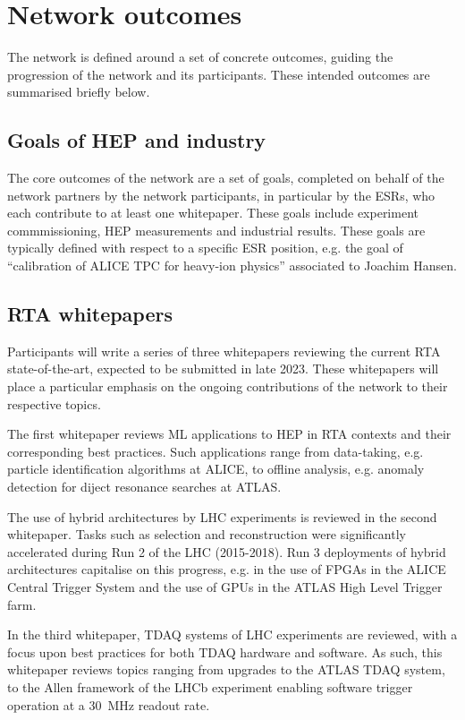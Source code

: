 \section{Network outcomes}
\label{outcomes}
The network is defined around a set of concrete outcomes, guiding the progression of the network and its participants. These intended outcomes are summarised briefly below.

\subsection{Goals of HEP and industry}
\label{goals}
The core outcomes of the network are a set of goals, completed on behalf of the network partners by the network participants, in particular by the ESRs, who each contribute to at least one whitepaper.  These goals include experiment commmissioning, HEP measurements and industrial results. These goals are typically defined with respect to a specific ESR position, e.g. the goal of ``calibration of ALICE TPC for heavy-ion physics'' associated to Joachim Hansen.

\subsection{RTA whitepapers}
\label{whitepapers}
Participants will write a series of three whitepapers reviewing the current RTA state-of-the-art, expected to be submitted in late 2023. These whitepapers will place a particular emphasis on the ongoing contributions of the network to their respective topics. \par 

The first whitepaper reviews ML applications to HEP in RTA contexts and their corresponding best practices. Such applications range from data-taking, e.g. particle identification algorithms at ALICE, to offline analysis, e.g. anomaly detection for diject resonance searches at ATLAS. \cite{ALICE-PID, ATLAS-dijet}\par
The use of hybrid architectures by LHC experiments is reviewed in the second whitepaper. Tasks such as selection and reconstruction were significantly accelerated during Run 2 of the LHC (2015-2018). Run 3 deployments of hybrid architectures capitalise on this progress, e.g. in the use of FPGAs in the ALICE Central Trigger System and the use of GPUs in the ATLAS High Level Trigger farm. \cite{ALICE-CTS, CMS-HLT-farm}\par
In the third whitepaper, TDAQ systems of LHC experiments are reviewed, with a focus upon best practices for both TDAQ hardware and software. As such, this whitepaper reviews topics ranging from upgrades to the ATLAS TDAQ system, to the Allen framework of the LHCb experiment enabling software trigger operation at a 30~MHz readout rate. \cite{ATLAS-TDAQ, LHCb-Allen}

